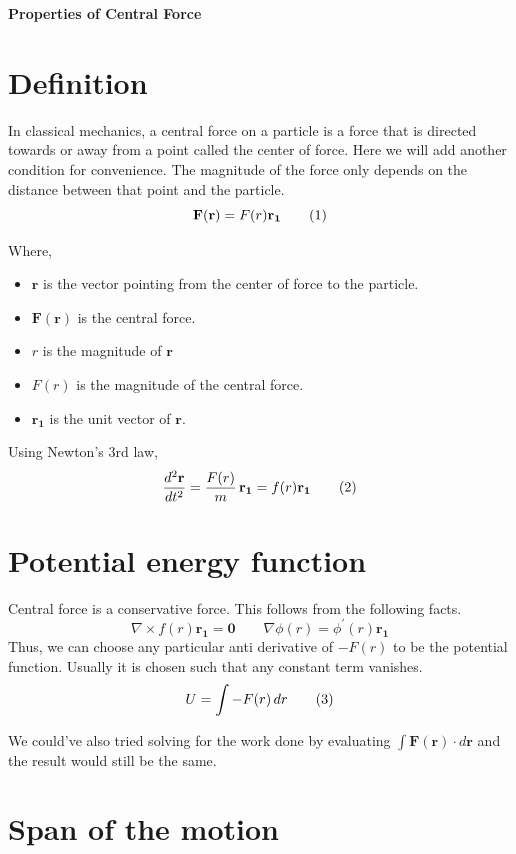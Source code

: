 \documentclass[a4paper, 12pt]{article}
\renewcommand{\indent}{\hspace{3ex}}
\newcommand\labelthis[1]{\addtocounter{equation}{1}\tag{\theequation}\label{#1}}
\renewcommand{\maketitle}{
	\begin{center}
		\Huge\bfseries{Properties of Central Force}
	\end{center}
	\bigskip
}
\renewcommand{\r}{\mathbf{r}}
\newcommand{\ru}{\mathbf{r_1}}
\renewcommand{\vec}[1]{\mathbf{#1}}
\newcommand{\ddtII}[1]{\frac{d^2#1}{dt^2}}
\begin{document}
\maketitle

\section{Definition}\label{definition}

\indent In classical mechanics, a central force on a particle is a force that is directed towards or away from a point called the center of force. Here we will add another condition for convenience. The magnitude of the force only depends on the distance between that point and the particle.
\[ \vec{F}(\r) = F(r) \ru \labelthis{eq:def central force} \]

Where,
\begin{itemize}
	\item $\r$ is the vector pointing from the center of force to the particle.
	\item $\vec{F}(\r)$ is the central force.
	\item $r$ is the magnitude of $\r$
	\item $F(r)$ is the magnitude of the central force.
	\item $\ru$ is the unit vector of $\r$.
\end{itemize}

Using Newton's 3rd law,
\[ \ddtII{\r} = \frac{F(r)}{m} \, \ru = f(r) \ru \labelthis{eq:def central acceleration} \]

\section{Potential energy function}\label{potential energy}

Central force is a conservative force. This follows from the following facts.
\[ \nabla \times f(r) \ru = \mathbf{0} \hspace{2em} \nabla \phi(r) = \phi^{'}(r) \ru \]
Thus, we can choose any particular anti derivative of $- F(r)$ to be the potential function. Usually it is chosen such that any constant term vanishes.
\[ U = \int - F(r) \, dr \labelthis{eq:potential energy} \]

We could've also tried solving for the work done by evaluating $\int \vec{F}(\r) \cdot d\r$ and the result would still be the same.

\section{Span of the motion}\label{span of motion}
\end{document}
